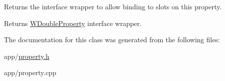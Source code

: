 Returns the interface wrapper to allow binding to slots on this property. 

\begin{DoxyReturn}{Returns}
\hyperlink{class_w_double_property}{W\-Double\-Property} interface wrapper. 
\end{DoxyReturn}


The documentation for this class was generated from the following files\-:\begin{DoxyCompactItemize}
\item 
app/\hyperlink{property_8h}{property.\-h}\item 
app/property.\-cpp\end{DoxyCompactItemize}
